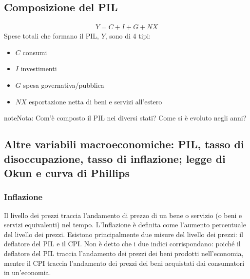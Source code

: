\documentclass[letterpaper,10pt,italian]{jupyterBook}
\begin{document}
\subsection{Composizione del PIL}
\label{\detokenize{ch/macro:composizione-del-pil}}\label{\detokenize{ch/macro:economics-hs-macro-intro-gdp}}\begin{equation*}
\begin{split}Y = C + I + G + NX\end{split}
\end{equation*}
\sphinxAtStartPar
Spese totali che formano il PIL, \(Y\), sono di 4 tipi:
\begin{itemize}
\item {} 
\sphinxAtStartPar
\(C\) consumi

\item {} 
\sphinxAtStartPar
\(I\) investimenti

\item {} 
\sphinxAtStartPar
\(G\) spesa governativa/pubblica

\item {} 
\sphinxAtStartPar
\(NX\) esportazione netta di beni e servizi all’estero

\end{itemize}

\begin{sphinxadmonition}{note}{Nota:}
\sphinxAtStartPar
Com’è composto il PIL nei diversi stati? Come si è evoluto negli anni?
\end{sphinxadmonition}


\subsection{Altre variabili macroeconomiche: PIL, tasso di disoccupazione, tasso di inflazione; legge di Okun e curva di Phillips}
\label{\detokenize{ch/macro:altre-variabili-macroeconomiche-pil-tasso-di-disoccupazione-tasso-di-inflazione-legge-di-okun-e-curva-di-phillips}}\label{\detokenize{ch/macro:economics-hs-macro-intro-macro-vars}}

\subsubsection{Inflazione}
\label{\detokenize{ch/macro:inflazione}}\label{\detokenize{ch/macro:economics-hs-macro-intro-macro-vars-inflation}}
\sphinxAtStartPar
{} Il livello dei prezzi traccia l’andamento di prezzo di un bene o servizio (o beni e servizi equivalenti) nel tempo. L’Inflazione è definita come l’aumento percentuale del livello dei prezzi. Esistono principalmente due misure del livello dei prezzi: il deflatore del PIL e il CPI. Non è detto che i due indici corrispondano: poiché il deflatore del PIL traccia l’andamento dei prezzi dei beni prodotti nell’economia, mentre il CPI traccia l’andamento dei prezzi dei beni acquistati dai consumatori in un’economia.
\end{document}
